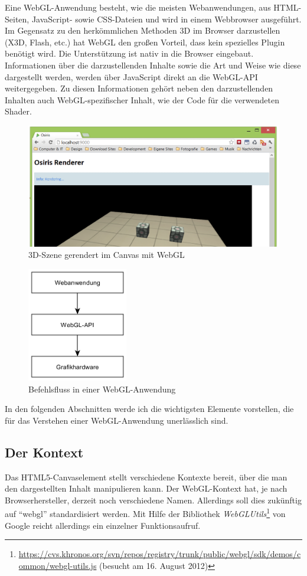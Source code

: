 Eine WebGL-Anwendung besteht, wie die meisten Webanwendungen, aus HTML-Seiten, JavaScript- sowie CSS-Dateien und wird in einem Webbrowser ausgeführt. Im Gegensatz zu den herkömmlichen Methoden 3D im Browser darzustellen (X3D, Flash, etc.) hat WebGL den großen Vorteil, dass kein spezielles Plugin benötigt wird. Die Unterstützung ist nativ in die Browser eingebaut. Informationen über die darzustellenden Inhalte sowie die Art und Weise wie diese dargestellt werden, werden über JavaScript direkt an die WebGL-API weitergegeben. Zu diesen Informationen gehört neben den darzustellenden Inhalten auch WebGL-spezifischer Inhalt, wie der Code für die verwendeten Shader.
\begin{figure}
\centering
\includegraphics[width=\textwidth]{bilder/canvas.png}
\caption{3D-Szene gerendert im Canvas mit WebGL}
\label{fig:webglcanvas}
\end{figure}
\begin{figure}
\centering
\includegraphics[height=50mm]{bilder/webglflow.png}
\caption{Befehlsfluss in einer WebGL-Anwendung}
\label{fig:webglflow}
\end{figure}
In den folgenden Abschnitten werde ich die wichtigsten Elemente vorstellen, die für das Verstehen einer WebGL-Anwendung unerlässlich sind.

\subsection{Der Kontext}
Das HTML5-Canvaselement stellt verschiedene Kontexte bereit, über die man den dargestellten Inhalt manipulieren kann. Der WebGL-Kontext hat, je nach Browserhersteller, derzeit noch verschiedene Namen. Allerdings soll dies zukünftig auf "`webgl"' standardisiert werden. Mit Hilfe der Bibliothek \textit{WebGLUtils}\footnote{\url{https://cvs.khronos.org/svn/repos/registry/trunk/public/webgl/sdk/demos/common/webgl-utils.js} (besucht am 16. August 2012)} von Google reicht allerdings ein einzelner Funktionsaufruf.


